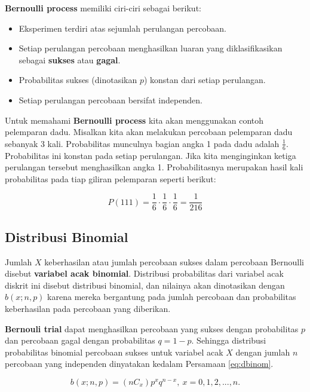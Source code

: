 \documentclass[]{book}
\providecommand{\tightlist}{%
  \setlength{\itemsep}{0pt}\setlength{\parskip}{0pt}}
\begin{document}
\textbf{Bernoulli process} memiliki ciri-ciri sebagai berikut:

\begin{itemize}
\tightlist
\item
  Eksperimen terdiri atas sejumlah perulangan percobaan.
\item
  Setiap perulangan percobaan menghasilkan luaran yang diklasifikasikan
  sebagai \textbf{sukses} atau \textbf{gagal}.
\item
  Probabilitas sukses (dinotasikan \(p\)) konstan dari setiap
  perulangan.
\item
  Setiap perulangan percobaan bersifat independen.
\end{itemize}

Untuk memahami \textbf{Bernoulli process} kita akan menggunakan contoh
pelemparan dadu. Misalkan kita akan melakukan percobaan pelemparan dadu
sebanyak 3 kali. Probabilitas munculnya bagian angka 1 pada dadu adalah
\(\frac{1}{6}\). Probabilitas ini konstan pada setiap perulangan. Jika
kita menginginkan ketiga perulangan tersebut menghasilkan angka 1.
Probabilitasnya merupakan hasil kali probabilitas pada tiap giliran
pelemparan seperti berikut:

\[
P\left(111\right)=\frac{1}{6}\cdot\frac{1}{6}\cdot\frac{1}{6}=\frac{1}{216}
\]

\subsection{Distribusi Binomial}\label{distribusi-binomial}

Jumlah \(X\) keberhasilan atau jumlah percobaan sukses dalam percobaan
Bernoulli disebut \textbf{variabel acak binomial}. Distribusi
probabilitas dari variabel acak diskrit ini disebut distribusi binomial,
dan nilainya akan dinotasikan dengan \(b\left(x;n,p\right)\) karena
mereka bergantung pada jumlah percobaan dan probabilitas keberhasilan
pada percobaan yang diberikan.

\textbf{Bernouli trial} dapat menghasilkan percobaan yang sukses dengan
probabilitas \(p\) dan percobaan gagal dengan probabilitas \(q=1-p\).
Sehingga distribusi probabilitas binomial percobaan sukses untuk
variabel acak \(X\) dengan jumlah \(n\) percobaan yang independen
dinyatakan kedalam Persamaan \eqref{eq:dbinom}.

\begin{equation}
   b\left(x;n,p\right)=\left(nC_x\right)p^xq^{n-x},\ x=0,1,2,...,n.
  \label{eq:dbinom}
\end{equation}
\end{document}
